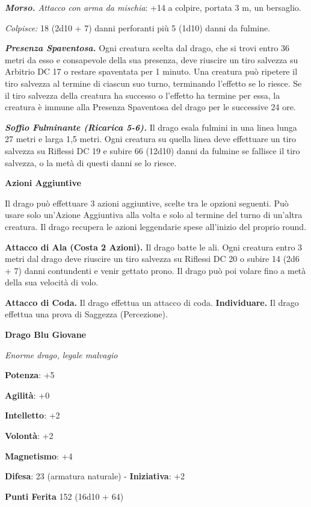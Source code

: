\begin{multicols}{2}
\emph{\textbf{Morso.} Attacco con arma da mischia}: +14 a colpire,
portata 3 m, un bersaglio.

\emph{Colpisce:} 18 (2d10 + 7) danni perforanti più 5 (1d10) danni da
fulmine.

\emph{\textbf{Presenza Spaventosa.}} Ogni creatura scelta dal drago, che
si trovi entro 36 metri da esso e consapevole della sua presenza, deve
riuscire un tiro salvezza su Arbitrio DC 17 o restare spaventata per 1
minuto. Una creatura può ripetere il tiro salvezza al termine di ciascun
suo turno, terminando l'effetto se lo riesce. Se il tiro salvezza della
creatura ha successo o l'effetto ha termine per essa, la creatura è
immune alla Presenza Spaventosa del drago per le successive 24 ore.

\emph{\textbf{Soffio Fulminante (Ricarica 5-6).}} Il drago esala fulmini
in una linea lunga 27 metri e larga 1,5 metri. Ogni creatura su quella
linea deve effettuare un tiro salvezza su Riflessi DC 19 e subire 66
(12d10) danni da fulmine se fallisce il tiro salvezza, o la metà di
questi danni se lo riesce.

\textbf{Azioni Aggiuntive}

Il drago può effettuare 3 azioni aggiuntive, scelte tra le opzioni
seguenti. Può usare solo un'Azione Aggiuntiva alla volta e solo al
termine del turno di un'altra creatura. Il drago recupera le azioni
leggendarie spese all'inizio del proprio round.

\textbf{Attacco di Ala (Costa 2 Azioni).} Il drago batte le ali. Ogni
creatura entro 3 metri dal drago deve riuscire un tiro salvezza su Riflessi DC 20 o subire 14 (2d6 + 7) danni contundenti e venir gettato
prono. Il drago può poi volare fino a metà della sua velocità di volo.

\textbf{Attacco di Coda.} Il drago effettua un attacco di coda.
\textbf{Individuare.} Il drago effettua una prova di Saggezza
(Percezione).

\textbf{Drago Blu Giovane}

\emph{Enorme drago, legale malvagio}

\textbf{Potenza}: +5

\textbf{Agilità}: +0

\textbf{Intelletto}: +2

\textbf{Volontà}: +2

\textbf{Magnetismo}: +4

\textbf{Difesa}: 23 (armatura naturale) - \textbf{Iniziativa}: +2

\textbf{Punti Ferita} 152 (16d10 + 64)


\end{multicols}
